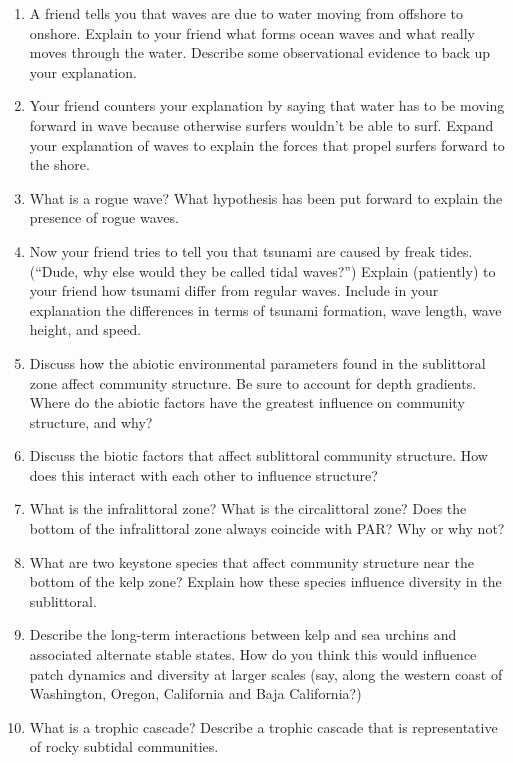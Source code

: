 \documentclass[nofonts, letterpaper]{tufte-handout}
\begin{document}
\begin{enumerate}

\item 
  A friend tells you that waves are due to water moving from 
  offshore to onshore.  Explain to your friend what forms ocean 
  waves and what really moves through the water. Describe some 
  observational evidence to back up your explanation.

\item 
  Your friend counters your explanation by saying that water has to 
  be moving forward in wave because otherwise surfers wouldn't 
  be able to surf.  Expand your explanation of waves to explain the 
  forces that propel surfers forward to the shore.

\item
  What is a rogue wave? What hypothesis has been put forward 
  to explain the presence of rogue waves.

\item
  Now your friend tries to tell you that tsunami are caused by freak 
  tides. (``Dude, why else would they be called tidal waves?'')
   Explain 
  (patiently) to your friend how tsunami differ from regular waves.  
  Include in your explanation the differences in terms of tsunami formation, 
  wave length, wave height, and speed.

\item
  Discuss how the abiotic environmental parameters found in the
  sublittoral zone affect community structure. Be sure to account for
  depth gradients. Where do the abiotic factors have the greatest
  influence on community structure, and why?
  
\item
  Discuss the biotic factors that affect sublittoral community
  structure. How does this interact with each other to influence
  structure?

\item
  What is the infralittoral zone? What is the circalittoral zone? Does
  the bottom of the infralittoral zone always coincide with PAR?
  Why or why not?

\item
  What are two keystone species that affect community structure near the
  bottom of the kelp zone? Explain how these species influence diversity
  in the sublittoral.

\item
  Describe the long-term interactions between kelp and sea urchins and 
  associated alternate stable states. How do you think this would influence 
  patch dynamics and diversity at larger scales (say, along the western 
  coast of Washington, Oregon, California and Baja California?)

\item
  What is a trophic cascade? Describe a trophic cascade that is
  representative of rocky subtidal communities.
  
\end{enumerate}
\end{document}
